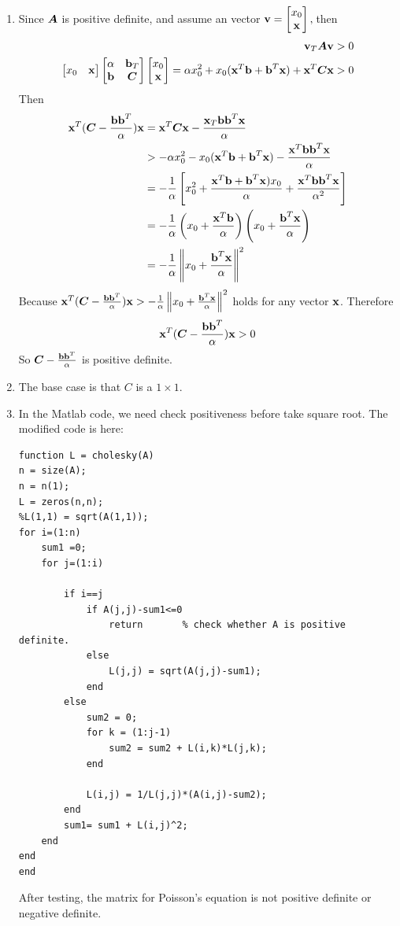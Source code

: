\documentclass{article}
\begin{document}
\begin{enumerate}
\item 
Since $\mA$ is positive definite, and assume an vector $\vv = \bmat{x_0\\ \vx}, \\ $then \\
\begin{align*} 
\vv_T\mA\vv>0 \\
\bmat{x_0 & \vx}\bmat{\alpha & \vb_T\\ \vb & \mC} \bmat{x_0\\ \vx} = \alpha x_0^2 + x_0(\vx^T\vb+\vb^T\vx) + \vx^T\mC\vx >0  
\end{align*}
Then 
\begin{align*}
\vx^T(\mC-\frac{\vb\vb^T}{\alpha})\vx &= \vx^T\mC\vx - \frac{\vx_T\vb\vb^T\vx}{\alpha} \\
& > -\alpha x_0^2 - x_0(\vx^T\vb+\vb^T\vx) - \frac{\vx^T\vb\vb^T\vx}{\alpha} \\
& = -\frac{1}{\alpha} \left[x_0^2 + \frac{\vx^T\vb+\vb^T\vx)x_0}{\alpha}+\frac{\vx^T\vb\vb^T\vx}{\alpha^2}\right]\\
& = -\frac{1}{\alpha}\left(x_0+\frac{\vx^T\vb}{\alpha}\right)\left(x_0+\frac{\vb^T\vx}{\alpha}\right) \\
& =  -\frac{1}{\alpha}\left\|x_0+\frac{\vb^T\vx}{\alpha}\right\|^2 
\end{align*} 
Because $\vx^T(\mC-\frac{\vb\vb^T}{\alpha})\vx > -\frac{1}{\alpha}\left\|x_0+\frac{\vb^T\vx}{\alpha}\right\|^2$ holds for any vector $\vx$. Therefore \begin{align} 
\vx^T(\mC-\frac{\vb\vb^T}{\alpha})\vx > 0 
\end{align} 
So $\mC-\frac{\vb\vb^T}{\alpha}$ is positive definite. 

\item  
The base case is that $C$ is a $1\times1$. 

\item 
In the Matlab code, we need check positiveness before take square root.  The modified code is here:  
\begin{lstlisting} 
function L = cholesky(A)
n = size(A); 
n = n(1); 
L = zeros(n,n);
%L(1,1) = sqrt(A(1,1)); 
for i=(1:n)
    sum1 =0;     
    for j=(1:i) 

        if i==j
            if A(j,j)-sum1<=0
                return       % check whether A is positive definite. 
            else
                L(j,j) = sqrt(A(j,j)-sum1); 
            end 
        else 
            sum2 = 0; 
            for k = (1:j-1) 
                sum2 = sum2 + L(i,k)*L(j,k); 
            end 
            
            L(i,j) = 1/L(j,j)*(A(i,j)-sum2); 
        end 
        sum1= sum1 + L(i,j)^2;   
    end 
end 
end 
\end{lstlisting} 
After testing, the matrix for Poisson's equation is not positive definite or negative definite.  \\ 

\end{enumerate}
\end{document}
